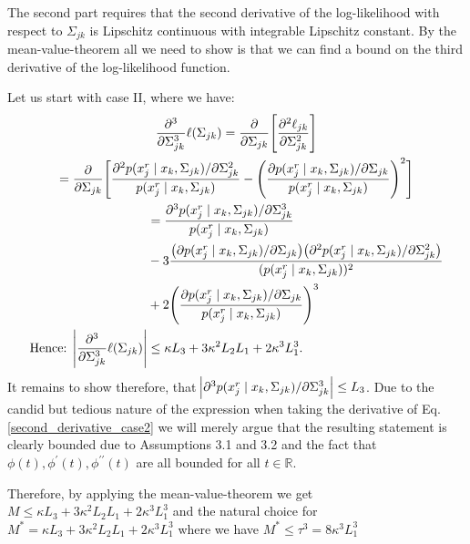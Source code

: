 \begin{condition}
    The second part requires that the second derivative of the log-likelihood with respect to $\Sigma_{jk}$ is Lipschitz continuous with integrable Lipschitz constant. By the mean-value-theorem all we need to show is that we can find a bound on the third derivative of the log-likelihood function.
    
    Let us start with case II, where we have:
    \begin{multline*}
            \frac{\partial^3}{\partial\Sigma_{jk}^3}\ell(\Sigma_{jk})
            = \frac{\partial}{\partial\Sigma_{jk}}\Bigg[\frac{\partial^2\ell_{jk}}{\partial \Sigma_{jk}^{2}}\Bigg] \\
            = \frac{\partial}{\partial\Sigma_{jk}}\Bigg[\frac{\partial^2 p(x_j^{r} \mid x_{k}, \Sigma_{jk})/\partial \Sigma_{jk}^{2}}{p(x_j^{r} \mid x_{k}, \Sigma_{jk})} - \Bigg(\frac{\partial p(x_j^{r} \mid x_{k}, \Sigma_{jk}) / \partial \Sigma_{jk}}{p(x_j^{r} \mid x_{k}, \Sigma_{jk})}\Bigg)^2\Bigg] \\
            \begin{aligned}
            &= \frac{\partial^3 p(x_j^{r} \mid x_{k}, \Sigma_{jk}) / \partial \Sigma_{jk}^3}{p(x_j^{r} \mid x_{k}, \Sigma_{jk})} \\
            &- 3\frac{\big(\partial p(x_j^{r} \mid x_{k}, \Sigma_{jk}) / \partial \Sigma_{jk}\big)\big( \partial^2 p(x_j^{r} \mid x_{k}, \Sigma_{jk}) / \partial \Sigma_{jk}^2\big)}{(p(x_j^{r} \mid x_{k}, \Sigma_{jk}))^2} \\
            &+ 2\Bigg(\frac{\partial p(x_j^{r} \mid x_{k}, \Sigma_{jk}) / \partial \Sigma_{jk}}{p(x_j^{r} \mid x_{k}, \Sigma_{jk})}\Bigg)^3 \\
            \text{Hence: } \abs{\frac{\partial^3}{\partial\Sigma_{jk}^3}\ell(\Sigma_{jk})} &\leq \kappa L_3 + 3\kappa^2L_2L_1 + 2 \kappa^3L_1^3.
            \end{aligned}
    \end{multline*}
    It remains to show therefore, that $\abs{\partial^3 p(x_j^{r} \mid x_{k}, \Sigma_{jk}) / \partial \Sigma_{jk}^3} \leq L_3$. Due to the candid but tedious nature of the expression when taking the derivative of Eq. \eqref{second_derivative_case2} we will merely argue that the resulting statement is clearly bounded due to Assumptions 3.1 and 3.2 
    and the fact that $\phi(t), \phi^\prime(t), \phi^{\prime\prime}(t)$ are all bounded for all $t \in \mathbb{R}$. 
    
    Therefore, by applying the mean-value-theorem we get $M \leq \kappa L_3 + 3\kappa^2L_2L_1 + 2 \kappa^3L_1^3$ and the natural choice for $M^* = \kappa L_3 + 3\kappa^2L_2L_1 + 2 \kappa^3L_1^3$ where we have $M^* \leq \tau^3 = 8\kappa^3L_1^3$   
    

\end{condition}
